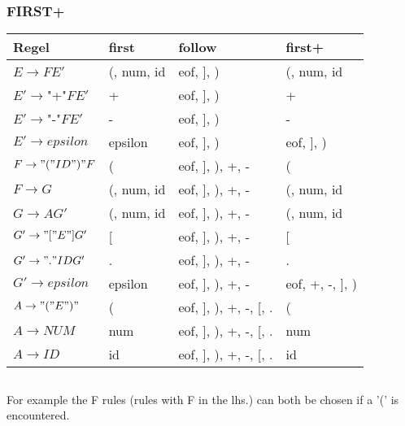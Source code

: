 \subsubsection{FIRST+}
\begin{tabular}{llll}
 Regel & first &  follow &  first+ \\
\hline
$E  \rightarrow F E'          $ & (, num, id    & eof, ], )              & (, num, id \\
$E' \rightarrow $"+"$ F E'    $ & +             & eof, ], )              & + \\
$E' \rightarrow $"-"$ F E'    $ & -             & eof, ], )              & - \\
$E' \rightarrow epsilon       $ & epsilon       & eof, ], )              & eof, ], ) \\
$F  \rightarrow "(" ID ")" F  $ & (             & eof, ], ), +, -        & ( \\
$F  \rightarrow G             $ & (, num, id    & eof, ], ), +, -        & (, num, id \\
$G  \rightarrow A G'          $ & (, num, id    & eof, ], ), +, -        & (, num, id \\
$G' \rightarrow "[" E "] G'   $ & [             & eof, ], ), +, -        & [ \\
$G' \rightarrow "." ID G'     $ & .             & eof, ], ), +, -        & . \\
$G' \rightarrow epsilon       $ & epsilon       & eof, ], ), +, -        & eof, +, -, ], ) \\
$A  \rightarrow "(" E ")"     $ & (             & eof, ], ), +, -, [, .  & ( \\
$A  \rightarrow NUM           $ & num           & eof, ], ), +, -, [, .  & num \\
$A  \rightarrow ID            $ & id            & eof, ], ), +, -, [, .  &  id \\
\end{tabular}

\subsection{}
For example the F rules (rules with F in the lhs.) can both be chosen if a '(' is encountered.

\subsection{}
